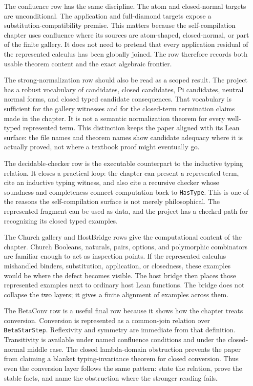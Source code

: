 The confluence row has the same discipline.  The atom and closed-normal
targets are unconditional.  The application and full-diamond targets expose a
substitution-compatibility premise.  This matters because the self-compilation
chapter uses confluence where its sources are atom-shaped, closed-normal, or
part of the finite gallery.  It does not need to pretend that every
application residual of the represented calculus has been globally joined.
The row therefore records both usable theorem content and the exact algebraic
frontier.

The strong-normalization row should also be read as a scoped result.  The
project has a robust vocabulary of candidates, closed candidates, Pi
candidates, neutral normal forms, and closed typed candidate consequences.
That vocabulary is sufficient for the gallery witnesses and for the
closed-term termination claims made in the chapter.  It is not a semantic
normalization theorem for every well-typed represented term.  This distinction
keeps the paper aligned with its Lean surface: the file names and theorem
names show candidate adequacy where it is actually proved, not where a
textbook proof might eventually go.

The decidable-checker row is the executable counterpart to the inductive
typing relation.  It closes a practical loop: the chapter can present a
represented term, cite an inductive typing witness, and also cite a recursive
checker whose soundness and completeness connect computation back to
\texttt{HasType}.  This is one of the reasons the self-compilation surface is
not merely philosophical.  The represented fragment can be used as data, and
the project has a checked path for recognizing its closed typed examples.

The Church gallery and HostBridge rows give the computational content of the
chapter.  Church Booleans, naturals, pairs, options, and polymorphic
combinators are familiar enough to act as inspection points.  If the
represented calculus mishandled binders, substitution, application, or
closedness, these examples would be where the defect becomes visible.  The
host bridge then places those represented examples next to ordinary host Lean
functions.  The bridge does not collapse the two layers; it gives a finite
alignment of examples across them.

The BetaConv row is a useful final row because it shows how the chapter treats
conversion.  Conversion is represented as a common-join relation over
\texttt{BetaStarStep}.  Reflexivity and symmetry are immediate from that
definition.  Transitivity is available under named confluence conditions and
under the closed-normal middle case.  The closed lambda-domain obstruction
prevents the paper from claiming a blanket typing-invariance theorem for
closed conversion.  Thus even the conversion layer follows the same pattern:
state the relation, prove the stable facts, and name the obstruction where
the stronger reading fails.

